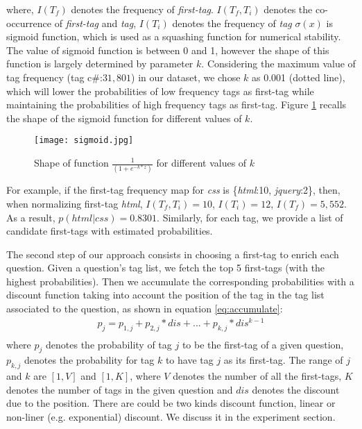 where, $I(T_f)$ denotes the frequency of \textit{first-tag}. $I(T_f,T_i)$ denotes the co-occurrence of \textit{first-tag} and \textit{tag}, $I(T_i)$ denotes the frequency of \textit{tag}  $\sigma(x)$ is sigmoid function, which is used as a squashing function for numerical stability. The value of sigmoid function is between 0 and 1, however the shape of this function is largely determined by parameter $k$. Considering the maximum value of tag frequency (tag c\#:$31,801$) in our dataset, we chose $k$ as 0.001 (dotted line), which will lower the probabilities of low frequency tags as first-tag while maintaining the probabilities of high frequency tags as first-tag. Figure \ref{fig:sigmoidfunction} recalls the shape of the sigmoid function for different values of $k$.

\begin{figure}[htp]
\centering
\texttt{[image: sigmoid.jpg]}  
\caption{Shape of function $\frac{1}{(1+e^{-k*z})}$ for different values of $k$}
\label{fig:sigmoidfunction} 
\end{figure}
For example, if the first-tag frequency map for \textit{css} is \{\textit{html}:10, \textit{jquery}:2\}, then, when normalizing first-tag \textit{html}, $I(T_f,T_i)=10$, $I(T_i)=12$, $I(T_f)=5,552$. As a result, $p(html|css)=0.8301$. 
Similarly, for each tag, we provide a list of candidate first-tags with estimated probabilities. 

The second step of our approach consists in choosing a first-tag to enrich each question. Given a question's tag list, we fetch the top 5 first-tags (with the highest probabilities). Then we accumulate the corresponding probabilities with a discount function taking into account the position of the tag in the tag list associated to the question, as shown in equation \ref{eq:accumulate}: 
\begin{equation}
\begin{split}
 p_{j}=  p_{1,j}+p_{2,j}*dis+...+p_{k,j}*dis^{k-1} \\
\end{split}
\label{eq:accumulate}
\end{equation}
where $p_{j}$ denotes the probability of  tag $j$ to be the first-tag of a given question, $p_{k,j}$ denotes the probability for tag $k$ to have tag $j$ as its first-tag. The range of $j$ and $k$ are $[1,V]$ and $[1,K]$, where $V$ denotes the number of all the first-tags, $K$ denotes the number of tags in the given question and $dis$ denotes the discount due to the position. There are could be two kinds discount function, linear or non-liner (e.g. exponential) discount. We discuss it in the experiment section.

